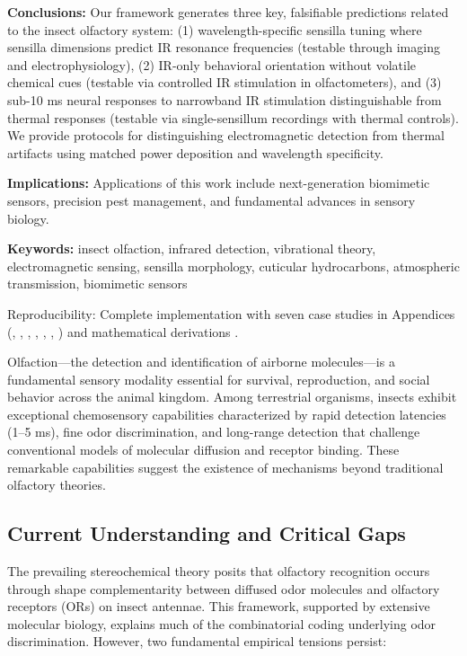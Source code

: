 \documentclass[
  13pt,
  a4paperpaper,
  12pt]{article}
\begin{document}
\textbf{Conclusions:} Our framework generates three key, falsifiable
predictions related to the insect olfactory system: (1)
wavelength-specific sensilla tuning where sensilla dimensions predict IR
resonance frequencies (testable through imaging and electrophysiology),
(2) IR-only behavioral orientation without volatile chemical cues
(testable via controlled IR stimulation in olfactometers), and (3)
sub-10 ms neural responses to narrowband IR stimulation distinguishable
from thermal responses (testable via single-sensillum recordings with
thermal controls). We provide protocols for distinguishing
electromagnetic detection from thermal artifacts using matched power
deposition and wavelength specificity.

\textbf{Implications:} Applications of this work include next-generation
biomimetic sensors, precision pest management, and fundamental advances
in sensory biology.

\textbf{Keywords:} insect olfaction, infrared detection, vibrational
theory, electromagnetic sensing, sensilla morphology, cuticular
hydrocarbons, atmospheric transmission, biomimetic sensors

Reproducibility: Complete implementation with seven case studies in
Appendices (,
, ,
, ,
, ) and
mathematical derivations .

Olfaction---the detection and identification of airborne molecules---is
a fundamental sensory modality essential for survival, reproduction, and
social behavior across the animal kingdom. Among terrestrial organisms,
insects exhibit exceptional chemosensory capabilities characterized by
rapid detection latencies (1--5 ms), fine odor discrimination, and
long-range detection that challenge conventional models of molecular
diffusion and receptor binding. These remarkable capabilities suggest
the existence of mechanisms beyond traditional olfactory theories.

\subsection{Current Understanding and Critical
Gaps}\label{current-understanding-and-critical-gaps}

The prevailing stereochemical theory posits that olfactory recognition
occurs through shape complementarity between diffused odor molecules and
olfactory receptors (ORs) on insect antennae. This framework, supported
by extensive molecular biology, explains much of the combinatorial
coding underlying odor discrimination. However, two fundamental
empirical tensions persist:
\end{document}
